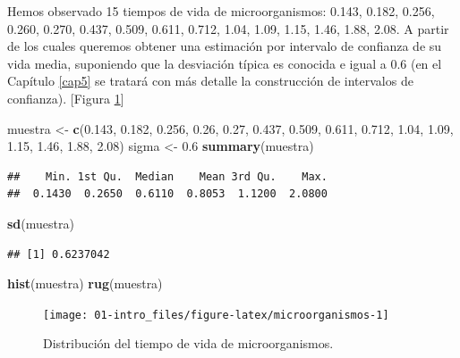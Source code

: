 \documentclass[]{book}
\newenvironment{Shaded}{\begin{snugshade}}{\end{snugshade}}
\newcommand{\KeywordTok}[1]{\textcolor[rgb]{0.13,0.29,0.53}{\textbf{#1}}}
\newcommand{\FloatTok}[1]{\textcolor[rgb]{0.00,0.00,0.81}{#1}}
\newcommand{\StringTok}[1]{\textcolor[rgb]{0.31,0.60,0.02}{#1}}
\newcommand{\NormalTok}[1]{#1}
\theoremstyle{definition}
\theoremstyle{definition}
\theoremstyle{definition}
\theoremstyle{remark}
\begin{document}
Hemos observado 15 tiempos de vida de microorganismos: 0.143, 0.182,
0.256, 0.260, 0.270, 0.437, 0.509, 0.611, 0.712, 1.04, 1.09, 1.15, 1.46,
1.88, 2.08. A partir de los cuales queremos obtener una estimación por
intervalo de confianza de su vida media, suponiendo que la desviación
típica es conocida e igual a 0.6 (en el Capítulo \ref{cap5} se tratará
con más detalle la construcción de intervalos de confianza).
 {[}Figura \ref{fig:microorganismos}{]}

\begin{Shaded}
\begin{Highlighting}[]
\NormalTok{muestra <-}\StringTok{ }\KeywordTok{c}\NormalTok{(}\FloatTok{0.143}\NormalTok{, }\FloatTok{0.182}\NormalTok{, }\FloatTok{0.256}\NormalTok{, }\FloatTok{0.26}\NormalTok{, }\FloatTok{0.27}\NormalTok{, }\FloatTok{0.437}\NormalTok{, }\FloatTok{0.509}\NormalTok{, }
    \FloatTok{0.611}\NormalTok{, }\FloatTok{0.712}\NormalTok{, }\FloatTok{1.04}\NormalTok{, }\FloatTok{1.09}\NormalTok{, }\FloatTok{1.15}\NormalTok{, }\FloatTok{1.46}\NormalTok{, }\FloatTok{1.88}\NormalTok{, }\FloatTok{2.08}\NormalTok{)}
\NormalTok{sigma <-}\StringTok{ }\FloatTok{0.6}
\KeywordTok{summary}\NormalTok{(muestra)}
\end{Highlighting}
\end{Shaded}

\begin{verbatim}
##    Min. 1st Qu.  Median    Mean 3rd Qu.    Max. 
##  0.1430  0.2650  0.6110  0.8053  1.1200  2.0800
\end{verbatim}

\begin{Shaded}
\begin{Highlighting}[]
\KeywordTok{sd}\NormalTok{(muestra)}
\end{Highlighting}
\end{Shaded}

\begin{verbatim}
## [1] 0.6237042
\end{verbatim}

\begin{Shaded}
\begin{Highlighting}[]
\KeywordTok{hist}\NormalTok{(muestra)}
\KeywordTok{rug}\NormalTok{(muestra)}
\end{Highlighting}
\end{Shaded}

\begin{figure}[!htb]

{\centering \texttt{[image: 01-intro\_files/figure-latex/microorganismos-1]} 

}

\caption{Distribución del tiempo de vida de microorganismos.}\label{fig:microorganismos}
\end{figure}
\end{document}

